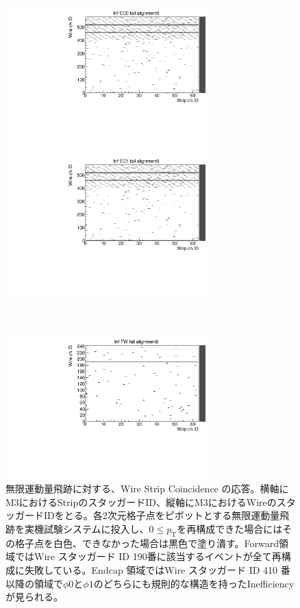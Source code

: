 \begin{figure}
    \begin{minipage}[b]{.5\linewidth}
        \centering
        \includegraphics[height=5.6cm]{fig/Test/A_InfEC0_WS.pdf}
    \end{minipage}
    \begin{minipage}[b]{.5\linewidth}
        \centering
        \includegraphics[height=5.6cm]{fig/Test/A_InfEC1_WS.pdf}
    \end{minipage}\\
    \begin{minipage}[b]{\linewidth}
        \centering
        \includegraphics[height=5.6cm]{fig/Test/A_InfFW_WS.pdf}
    \end{minipage}
    \caption[無限運動量飛跡に対する、Wire Strip Coincidence の応答]{無限運動量飛跡に対する、Wire Strip Coincidence の応答。横軸にM3におけるStripのスタッガードID、縦軸にM3におけるWireのスタッガードIDをとる。各2次元格子点をピボットとする無限運動量飛跡を実機試験システムに投入し、$0 \leq p_\mathrm{T}$を再構成できた場合にはその格子点を白色、できなかった場合は黒色で塗り潰す。Forward領域ではWire スタッガード ID 190番に該当するイベントが全て再構成に失敗している。Endcap 領域ではWire スタッガード ID 410 番以降の領域で$\phi0$と$\phi1$のどちらにも規則的な構造を持ったInefficiencyが見られる。}
    \label{Inf_A_WS}
\end{figure}

